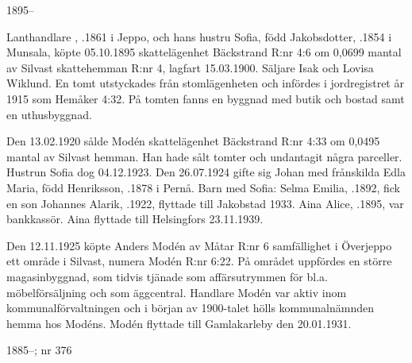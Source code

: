 
 1895--

Lanthandlare , .1861 i Jeppo, och hans hustru Sofia, född Jakobsdotter, .1854 i Munsala, köpte 05.10.1895 skattelägenhet Bäckstrand R:nr 4:6 om 0,0699 mantal av Silvast skattehemman R:nr 4, lagfart 15.03.1900. Säljare Isak och Lovisa Wiklund. En tomt utstyckades från stomlägenheten och infördes i jordregistret år 1915 som Hemåker 4:32. På tomten fanns en byggnad med butik och bostad samt en uthusbyggnad.

Den 13.02.1920 sålde Modén skattelägenhet Bäckstrand R:nr 4:33 om 0,0495 mantal av Silvast hemman. Han hade sålt tomter och undantagit några parceller. Hustrun Sofia dog 04.12.1923. Den 26.07.1924 gifte sig Johan med frånskilda Edla Maria, född Henriksson, .1878 i Pernå.
Barn med Sofia:
Selma Emilia, .1892, fick en son Johannes Alarik, .1922, flyttade till Jakobstad 1933.
Aina Alice, .1895, var bankkassör. Aina flyttade till Helsingfors 23.11.1939.

Den 12.11.1925 köpte Anders Modén av Måtar R:nr 6 samfällighet i Överjeppo ett område i Silvast, numera Modén R:nr 6:22. På området uppfördes en större magasinbyggnad, som tidvis tjänade som affärsutrymmen för bl.a. möbelförsäljning och som äggcentral. Handlare Modén var aktiv inom kommunalförvaltningen och i början av 1900-talet hölls kommunalnämnden hemma hos Modéns. Modén flyttade till Gamlakarleby den 20.01.1931.


 1885--; nr 376

